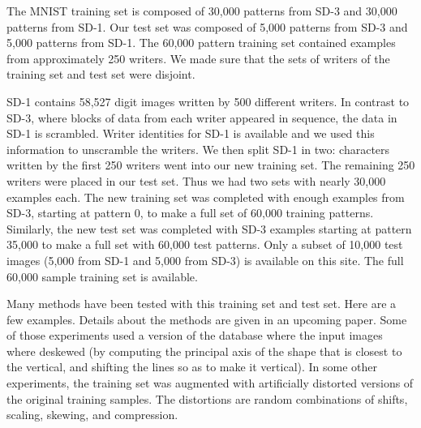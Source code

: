 The MNIST training set is composed of 30,000 patterns from SD-3 and 30,000 patterns from SD-1. Our test set was composed of 5,000 patterns from SD-3 and 5,000 patterns from SD-1. The 60,000 pattern training set contained examples from approximately 250 writers. We made sure that the sets of writers of the training set and test set were disjoint.

SD-1 contains 58,527 digit images written by 500 different writers. In contrast to SD-3, where blocks of data from each writer appeared in sequence, the data in SD-1 is scrambled. Writer identities for SD-1 is available and we used this information to unscramble the writers. We then split SD-1 in two: characters written by the first 250 writers went into our new training set. The remaining 250 writers were placed in our test set. Thus we had two sets with nearly 30,000 examples each. The new training set was completed with enough examples from SD-3, starting at pattern 0, to make a full set of 60,000 training patterns. Similarly, the new test set was completed with SD-3 examples starting at pattern 35,000 to make a full set with 60,000 test patterns. Only a subset of 10,000 test images (5,000 from SD-1 and 5,000 from SD-3) is available on this site. The full 60,000 sample training set is available.

Many methods have been tested with this training set and test set. Here are a few examples. Details about the methods are given in an upcoming paper. Some of those experiments used a version of the database where the input images where deskewed (by computing the principal axis of the shape that is closest to the vertical, and shifting the lines so as to make it vertical). In some other experiments, the training set was augmented with artificially distorted versions of the original training samples. The distortions are random combinations of shifts, scaling, skewing, and compression. 

